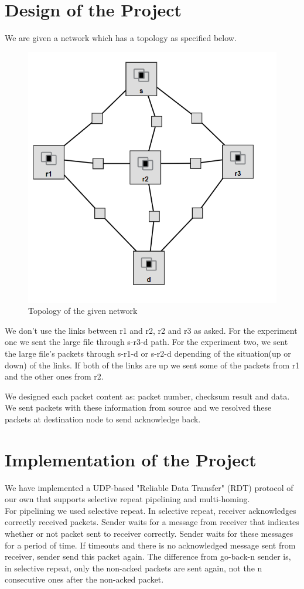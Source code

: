 \documentclass[conference]{IEEEtran}
\begin{document}
\section{Design of the Project}
We are given a network which has a topology as specified below.
\begin{figure}[h!]
\includegraphics[scale = 0.75]{tp.png}
\caption{Topology of the given network}
\end{figure}
We don't use the links between  r1 and r2, r2 and r3 as asked. For the experiment one we sent the large file through s-r3-d path. For the experiment two, we sent the large file's packets through s-r1-d or s-r2-d depending of the situation(up or down) of the links. If both of the links are up we sent some of the packets from r1 and the other ones from r2.

We designed each packet content as: packet number, checksum result and data. We sent packets with these information from source and we resolved these packets at destination node to send acknowledge back.


\section{Implementation of the Project} 

We have implemented a UDP-based "Reliable Data Transfer" (RDT) protocol of our own that supports selective repeat pipelining and multi-homing. \\
For pipelining we used selective repeat. In selective repeat, receiver acknowledges correctly received packets. Sender waits for a message from receiver that indicates whether or not packet sent to receiver correctly. Sender waits for these messages for a period of time. If timeouts and there is no acknowledged message sent from receiver, sender send this packet again. The difference from go-back-n sender is, in selective repeat, only the non-acked packets are sent again, not the n consecutive ones after the non-acked packet.
\end{document}
